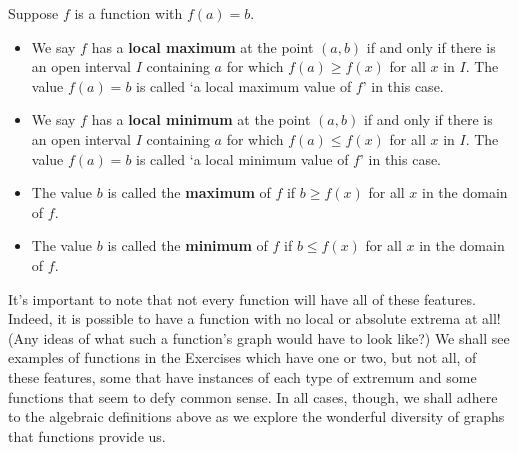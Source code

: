 \colorbox{ResultColor}{\bbm


\begin{defn}

\label{maxmindefn}

Suppose $f$ is a function with $f(a) = b$.

\begin{itemize}

\item  We say $f$ has a \textbf{local maximum} at the point $(a,b)$ if and only if there is an open interval $I$ containing $a$ for which $f(a) \geq f(x)$ for all $x$ in $I$.  The value $f(a) = b$ is called `a  local maximum value of $f$' in this case. 
 
\item  We say $f$ has a \textbf{local minimum} at the point $(a,b)$ if and only if there is an open interval $I$ containing $a$ for which $f(a) \leq f(x)$ for all $x$ in $I$.  The value $f(a) = b$ is called `a  local minimum value of $f$' in this case. 

\item  The value $b$ is called the \textbf{maximum} of $f$ if $b \geq f(x)$ for all $x$ in the domain of $f$. 

\item  The value $b$ is called the \textbf{minimum} of $f$ if $b \leq f(x)$ for all $x$ in the domain of $f$. 

\end{itemize}

\end{defn}

\ebm}

\medskip

It's important to note that not every function will have all of these features.  Indeed, it is possible to have a function with no local or absolute extrema at all!  (Any ideas of what such a function's graph would have to look like?)  We shall see examples of functions in the Exercises which have one or two, but not all, of these features, some that have instances of each type of extremum and some functions that seem to defy common sense.  In all cases, though, we shall adhere to the algebraic definitions above as we explore the wonderful diversity of graphs that functions provide us.

\medskip

